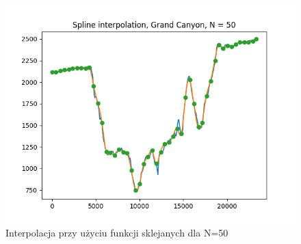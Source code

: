 \documentclass{article}
\begin{document}
\begin{itemize}
\begin{figure}[!htb]
      \includegraphics[width=\linewidth]{Grand_Canyon_splines_N_50.png}
      \caption{Interpolacja przy użyciu funkcji sklejanych dla N=50}
    \endminipage\hfill
    \end{figure}
    

\end{itemize}
\end{document}
